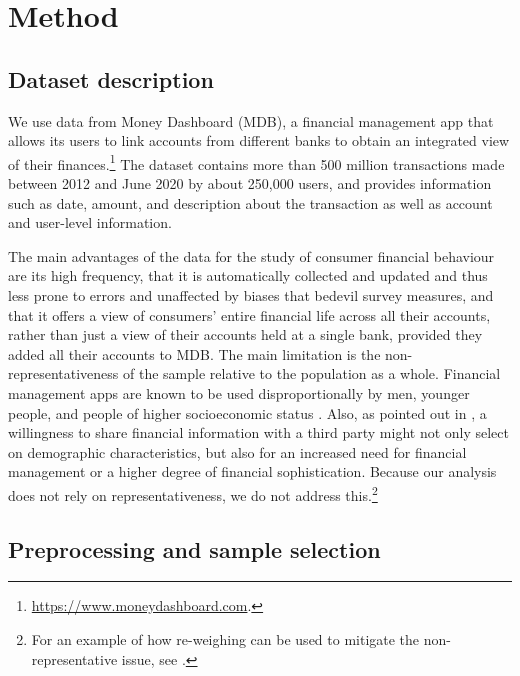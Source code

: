 
\section{Method}%
\label{sec:method}


\subsection{Dataset description}
\label{sub:dataset_description}

We use data from Money Dashboard (MDB), a financial management app that allows
its users to link accounts from different banks to obtain an integrated view of
their
finances.\footnote{\href{https://www.moneydashboard.com}{https://www.moneydashboard.com}.}
The dataset contains more than 500 million transactions made between 2012 and
June 2020 by about 250,000 users, and provides information such as date,
amount, and description about the transaction as well as account and user-level
information.

The main advantages of the data for the study of consumer financial behaviour
are its high frequency, that it is automatically collected and updated and thus
less prone to errors and unaffected by biases that bedevil survey measures, and
that it offers a view of consumers' entire financial life across all their
accounts, rather than just a view of their accounts held at a single bank,
provided they added all their accounts to MDB. The main limitation is the
non-representativeness of the sample relative to the population as a whole.
Financial management apps are known to be used disproportionally by men,
younger people, and people of higher socioeconomic status
\citep{carlin2019generational}. Also, as pointed out in
\citet{gelman2014harnessing}, a willingness to share financial information with
a third party might not only select on demographic characteristics, but also
for an increased need for financial management or a higher degree of financial
sophistication. Because our analysis does not rely on representativeness, we do
not address this.\footnote{For an example of how re-weighing can be used to
mitigate the non-representative issue, see \citet{bourquin2020effects}.}


\subsection{Preprocessing and sample selection}%
\label{sub:preprocessing_and_sample_selection}

